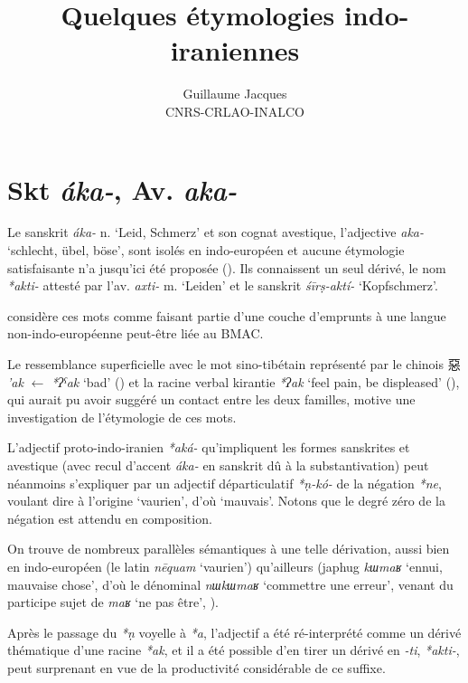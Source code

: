 \documentclass[11pt]{article}
\newcommand{\ipa}[1]{{\phon\textit{#1}}}
\newcommand{\zh}[1]{{\cn #1}}
\begin{document}
 
\title{Quelques étymologies indo-iraniennes}
\author{Guillaume Jacques\\ CNRS-CRLAO-INALCO}
\maketitle

\sloppy
\section{Skt \ipa{áka-}, Av.  \ipa{aka-}}
Le sanskrit \ipa{áka-} n.  `Leid, Schmerz' et son cognat avestique, l'adjective \ipa{aka-} `schlecht, übel, böse', sont isolés en indo-européen et aucune étymologie satisfaisante n'a jusqu'ici été proposée  (\citealt[I:39]{mayrhofer92ewa}). Ils connaissent un seul dérivé, le nom \ipa{*akti-} attesté par l'av.  \ipa{axti-} m. `Leiden' et le sanskrit \ipa{śīrṣ-aktí-} `Kopfschmerz'.

\citet{lubotsky2001indo} considère ces mots comme faisant partie d'une couche d'emprunts à une langue non-indo-européenne peut-être liée au BMAC.

Le ressemblance superficielle avec le mot sino-tibétain représenté par le chinois \zh{惡} \ipa{'ak} $\leftarrow$ \ipa{*ʔˁak} `bad' (\citealt{bs14oc}) et la racine verbal kirantie \ipa{*ʔak} `feel pain, be displeased' (\citealt{jacques17pkiranti}), qui aurait pu avoir suggéré un contact entre les deux familles, motive une investigation de l'étymologie de ces mots.

L'adjectif proto-indo-iranien  \ipa{*aká-} qu'impliquent les formes sanskrites et avestique (avec recul d'accent \ipa{áka-} en sanskrit dû à la substantivation) peut néanmoins s'expliquer par un adjectif départiculatif \ipa{*ṇ-kó-} de la négation \ipa{*ne}, voulant dire à l'origine `vaurien', d'où `mauvais'. Notons que le degré zéro de la négation est attendu en composition.

On trouve de nombreux parallèles sémantiques à une telle dérivation, aussi bien en indo-européen (le latin \ipa{nēquam} `vaurien') qu'ailleurs (japhug \ipa{kɯmaʁ} `ennui, mauvaise chose', d'où le dénominal \ipa{nɯkɯmaʁ} `commettre une erreur', venant du participe sujet de \ipa{maʁ} `ne pas être', \citealt{jacques16japhug}).  

Après le passage du \ipa{*ṇ} voyelle à \ipa{*a}, l'adjectif a été ré-interprété comme un dérivé thématique d'une racine \ipa{*ak}, et il a été possible d'en tirer un dérivé en \ipa{-ti}, \ipa{*akti-}, peut surprenant en vue de la productivité considérable de ce suffixe.
\end{document}
